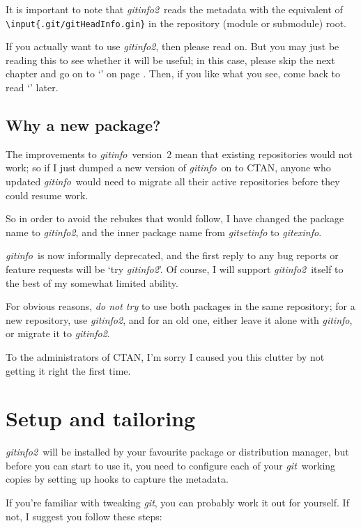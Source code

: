 \documentclass[draft,a4paper,12pt,twoside,openany]{memoir}
\newcommand{\sfit}[1]{\textit{#1}}
\newcommand{\git}{\sfit{git}}
\newcommand{\opname}{\sfit{gitinfo}}
\newcommand{\tpname}{\sfit{gitinfo2}}
\newcommand{\ginname}{gitHeadInfo.gin}
\begin{document}
It is important to note that \tpname\ reads the metadata
with the equivalent of \texttt{\textbackslash input\{.git/\ginname\}}
in the repository (module or submodule) root.

If you actually want to use \tpname, then please read on.
But you may just be reading this to see whether it will be useful;
in this case,
please skip the next chapter and go on to `'
on page \pageref*{ch:using}.
Then, if you like what you see, come back to
read `' later.

\clearpage
\section{Why a new package?}

The improvements to \opname\ version~2 mean that 
existing repositories would not work; 
so if I just dumped a new version of \opname\  
on to CTAN, anyone who updated \opname\ 
would need to migrate all their active repositories
before they could resume work.

So in order to avoid the rebukes that would follow, 
I have changed the package name to \tpname, 
and the inner package name from \sfit{gitsetinfo}
to \sfit{gitexinfo}.

\opname\ is now informally deprecated, 
and the first reply to any bug reports or feature requests
will be `try \tpname'.
Of course, I will support \tpname\ itself 
to the best of my somewhat limited ability. 

For obvious reasons, \emph{do not try} 
to use both packages in the same repository;
for a new repository, use \tpname,
and for an old one, either leave it alone with \opname,
or migrate it to \tpname.

To the administrators of CTAN, 
I'm sorry I caused you this clutter 
by not getting it right the first time.

\chapter{Setup and tailoring}
\label{ch:setup}

\tpname\ will be installed by your favourite package or distribution manager,
but before you can start to use it,
you need to configure each of your \git\ working copies
by setting up hooks to capture the metadata.

If you're familiar with tweaking \git, you can probably work it out for yourself.
If not, I suggest you follow these steps:
\end{document}
